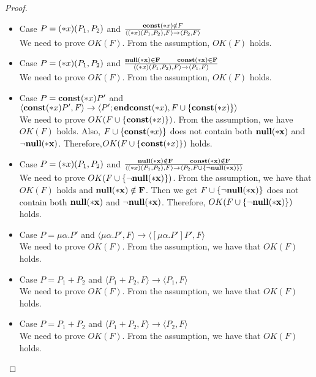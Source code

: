 \begin{proof}
\begin{itemize}
    \item Case \( P = (*x)(P_1,P_2)\) and \( \frac{\mathbf{const}(*x) \notin F}
      { \langle (*x)(P_1, P_2), F \rangle
      \rightarrow \langle P_2, F \rangle } \) \\
      We need to prove \( OK(F)\). From the assumption, \(OK(F)\) holds.

    \item Case \( P = (*x)(P_1,P_2)\) and \( \frac{ \bf{null}(*x) \in F \quad\quad \mathbf{const}(*x) \in F}
      { \langle (*x)(P_1, P_2), F \rangle
      \rightarrow \langle P_1, F \rangle } \) \\
      We need to prove \( OK(F)\). From the assumption, \(OK(F)\) holds.

    \item Case \( P = \mathbf{const}(*x) P'\) and \(  \langle \mathbf{const}(*x)
      P', F \rangle \rightarrow \langle P';\mathbf{endconst}(*x), F\cup\{\mathbf{const}(*x)\} \rangle \) \\
      We need to prove \( OK(F\cup\{\mathbf{const}(*x)\})\). From the
      assumption, we have \(OK(F)\) holds. Also,
      \(F\cup\{\mathbf{const}(*x)\}\) does not contain both \(\bf{null}(*x)\) and \(
      \neg\bf{null}(*x)\). Therefore,\( OK(F\cup\{ \mathbf{const}(*x)\})\) holds.

    \item Case \( P = (*x)(P_1,P_2)\) and \( \frac{ \bf{null}(*x) \notin F \quad\quad \mathbf{const}(*x) \notin F}
      { \langle (*x)(P_1, P_2), F \rangle
      \rightarrow \langle P_2, F\cup\{\neg\bf{null}(*x)\} \rangle } \) \\
      We need to prove \( OK(F\cup\{\neg\bf{null}(*x)\})\). From the assumption,
      we have that \(OK(F)\) holds and \( \bf{null}(*x) \notin F\). Then we
      get \(F\cup\{\neg\bf{null}(*x)\}\) does not contain both \(\bf{null}(*x)\) and
      \(\neg\bf{null}(*x)\). Therefore, \( OK(F\cup\{\neg\bf{null}(*x)\})\) holds.


    \item Case \( P = \mu\alpha.P'\) and \( \langle \mu\alpha.P', F \rangle
      \rightarrow \langle [\mu\alpha.P']P', F \rangle \) \\
      We need to prove \( OK(F)\). From the assumption, we have that
      \(OK(F)\) holds.

    \item Case \( P = P_1 + P_2\) and \( \langle P_1 + P_2, F \rangle
      \rightarrow \langle P_1, F \rangle \) \\
      We need to prove \( OK(F)\). From the assumption, we have that
      \(OK(F)\) holds.

    \item Case \( P = P_1 + P_2\) and \(  \langle P_1 + P_2, F \rangle
      \rightarrow \langle P_2, F \rangle \) \\
      We need to prove \( OK(F)\). From the assumption, we have that
      \(OK(F)\) holds.


\end{itemize}
\end{proof}
